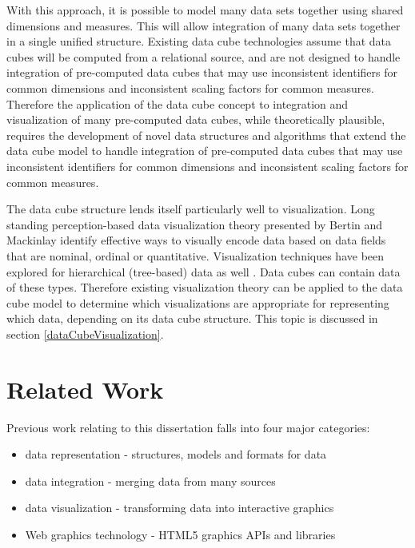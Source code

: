 With this approach, it is possible to model many data sets together using shared dimensions and measures. This will allow integration of many data sets together in a single unified structure. Existing data cube technologies assume that data cubes will be computed from a relational source, and are not designed to handle integration of pre-computed data cubes that may use inconsistent identifiers for common dimensions and inconsistent scaling factors for common measures. Therefore the application of the data cube concept to integration and visualization of many pre-computed data cubes, while theoretically plausible, requires the development of novel data structures and algorithms that extend the data cube model to handle integration of pre-computed data cubes that may use inconsistent identifiers for common dimensions and inconsistent scaling factors for common measures.

The data cube structure lends itself particularly well to visualization. Long standing perception-based data visualization theory presented by Bertin \cite{bertin1983semiology} and Mackinlay \cite{mackinlay1986automating} identify effective ways to visually encode data based on data fields that are nominal, ordinal or quantitative. Visualization techniques have been explored for hierarchical (tree-based) data as well \cite{graham2010survey}. Data cubes can contain data of these types. Therefore existing visualization theory can be applied to the data cube model to determine which visualizations are appropriate for representing which data, depending on its data cube structure. This topic is discussed in section \ref{dataCubeVisualization}.

\pagebreak
\section{Related Work}
Previous work relating to this dissertation falls into four major categories:
\begin{itemize}
\item data representation - structures, models and formats for data
\item data integration - merging data from many sources
\item data visualization - transforming data into interactive graphics
\item Web graphics technology - HTML5 graphics APIs and libraries
\end{itemize}
